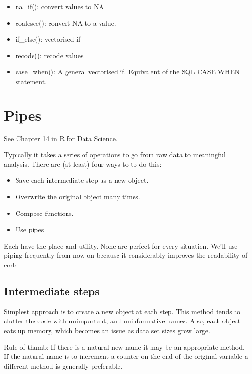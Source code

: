 \documentclass[]{book}
\providecommand{\tightlist}{%
  \setlength{\itemsep}{0pt}\setlength{\parskip}{0pt}}
\theoremstyle{definition}
\theoremstyle{definition}
\theoremstyle{definition}
\theoremstyle{remark}
\let\BeginKnitrBlock\begin \let\EndKnitrBlock\end
\begin{document}
\begin{itemize}
\tightlist
\item
  na\_if(): convert values to NA
\item
  coalesce(): convert NA to a value.
\item
  if\_else(): vectorised if
\item
  recode(): recode values
\item
  case\_when(): A general vectorised if. Equivalent of the SQL CASE WHEN
  statement.
\end{itemize}

\section{Pipes}\label{pipes}

\BeginKnitrBlock{rmdimportant}
See Chapter 14 in \href{http://r4ds.had.co.nz/pipes.html}{R for Data
Science}.
\EndKnitrBlock{rmdimportant}

Typically it takes a series of operations to go from raw data to
meaningful analysis. There are (at least) four ways to to do this:

\begin{itemize}
\tightlist
\item
  Save each intermediate step as a new object.
\item
  Overwrite the original object many times.
\item
  Compose functions.
\item
  Use pipes
\end{itemize}

Each have the place and utility. None are perfect for every situation.
We'll use piping frequently from now on because it considerably improves
the readability of code.

\subsection{Intermediate steps}\label{intermediate-steps}

Simplest approach is to create a new object at each step. This method
tends to clutter the code with unimportant, and uninformative names.
Also, each object eats up memory, which becomes an issue as data set
sizes grow large.

Rule of thumb: If there is a natural new name it may be an appropriate
method. If the natural name is to increment a counter on the end of the
original variable a different method is generally preferable.
\end{document}
